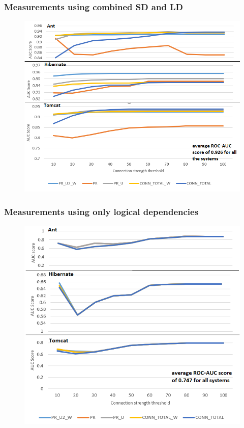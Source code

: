 \documentclass{beamer}
\begin{document}

 \begin{frame}
\frametitle{Measurements using combined SD and LD}
 \begin{center}
     \begin{figure}
	\includegraphics[width=\textwidth]{ld_st_measurements.png}
     \end{figure}
\end{center}

\end{frame}


 \begin{frame}
\frametitle{Measurements using only logical dependencies}
 \begin{center}
     \begin{figure}
	\includegraphics[scale=0.68]{ld_measurements.png}
     \end{figure}
\end{center}
\end{frame}
\end{document}
